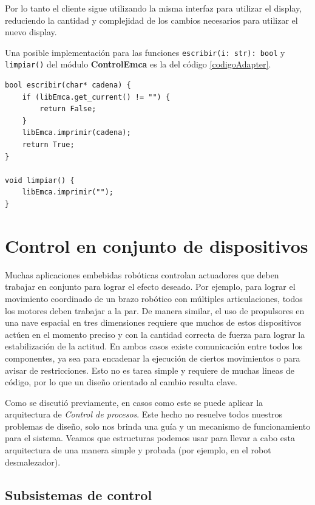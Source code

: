 Por lo tanto el cliente sigue utilizando la misma interfaz para utilizar el display, reduciendo la cantidad y complejidad de los cambios necesarios para utilizar el nuevo display.

Una posible implementación para las funciones \verb|escribir(i: str): bool| y \verb|limpiar()| del módulo \textbf{ControlEmca} es la del código \ref{codigoAdapter}.

\begin{lstlisting}[label={codigoAdapter}, caption=Ejemplo implementación módulo Adapter.]
bool escribir(char* cadena) {
    if (libEmca.get_current() != "") {
        return False;
    }
    libEmca.imprimir(cadena);
    return True;
}

void limpiar() {
    libEmca.imprimir("");
}
\end{lstlisting}

\section{Control en conjunto de dispositivos}
Muchas aplicaciones embebidas robóticas controlan \gls{actuadores} que deben trabajar en conjunto para lograr el efecto deseado. Por ejemplo, para lograr el movimiento coordinado de un brazo robótico con múltiples articulaciones, todos los motores deben trabajar a la par. De manera similar, el uso de propulsores en una nave espacial en tres dimensiones requiere que muchos de estos dispositivos actúen en el momento preciso y con la cantidad correcta de fuerza para lograr la estabilización de la actitud. En ambos casos existe comunicación entre todos los componentes, ya sea para encadenar la ejecución de ciertos movimientos o para avisar de restricciones. Esto no es tarea simple y requiere de muchas lineas de código, por lo que un diseño orientado al cambio resulta clave.

Como se discutió previamente, en casos como este se puede aplicar la arquitectura de \textit{Control de procesos}. Este hecho no resuelve todos nuestros problemas de diseño, solo nos brinda una guía y un mecanismo de funcionamiento para el sistema. Veamos que estructuras podemos usar para llevar a cabo esta arquitectura de una manera simple y probada (por ejemplo, en el robot desmalezador).

\subsection{Subsistemas de control}

